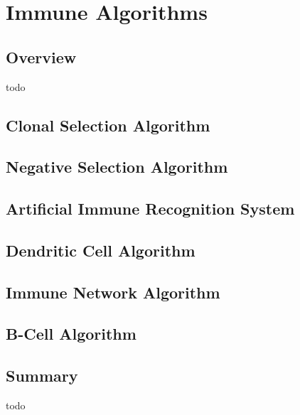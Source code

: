 \chapter{Immune Algorithms}
\label{ch:immune}

\section{Overview}
todo



\section{Clonal Selection Algorithm}
\section{Negative Selection Algorithm}
\section{Artificial Immune Recognition System}
\section{Dendritic Cell Algorithm}
\section{Immune Network Algorithm}
\section{B-Cell Algorithm}

\section{Summary}
todo
